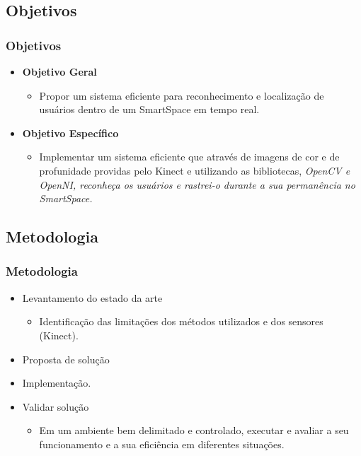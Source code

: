 \documentclass{beamer}
\begin{document}
\subsection{Objetivos}
\begin{frame}
    \frametitle{Objetivos}
    \begin{itemize}
      \item \textbf{Objetivo Geral}
        \begin{itemize}
          \item Propor um sistema eficiente para reconhecimento e localização de usuários dentro de um SmartSpace em tempo real.
        \end{itemize}
      \item \textbf{Objetivo Específico}
        \begin{itemize}
            \item Implementar um sistema eficiente que através de imagens de cor e de profunidade providas pelo Kinect e utilizando as bibliotecas, \it{OpenCV} e \it{OpenNI}, reconheça os usuários e rastrei-o durante a sua permanência no \it{SmartSpace}.
        \end{itemize}
    \end{itemize}
\end{frame}

\subsection{Metodologia}
\begin{frame}
    \frametitle{Metodologia}
    \begin{itemize}
    \item Levantamento do estado da arte
        \begin{itemize}
            \item Identificação das limitações dos métodos utilizados e dos sensores (Kinect).
        \end{itemize}
    \pause \item Proposta de solução
    \pause \item Implementação.
    \pause \item Validar solução
        \begin{itemize}
            \item Em um ambiente bem delimitado e controlado, executar e avaliar a seu funcionamento e a sua eficiência em diferentes situações.
        \end{itemize}
    \end{itemize}
\end{frame}
\end{document}
